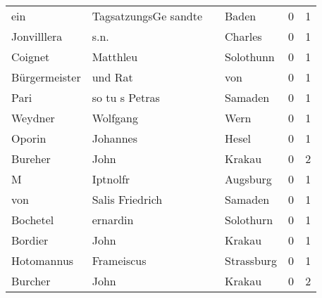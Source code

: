 \begin{tabular}{llllrr}
                      ein &               TagsatzungsGe sandte &             &                                       Baden &          0 &         1 \\
              Jonvilllera &                               s.n. &             &                                     Charles &          0 &         1 \\
                  Coignet &                           Matthleu &             &                                   Solothunn &          0 &         1 \\
            Bürgermeister &                            und Rat &             &                                         von &          0 &         1 \\
                     Pari &                     so tu s Petras &             &                                     Samaden &          0 &         1 \\
                  Weydner &                           Wolfgang &             &                                        Wern &          0 &         1 \\
                   Oporin &                           Johannes &             &                                       Hesel &          0 &         1 \\
                  Bureher &                               John &             &                                      Krakau &          0 &         2 \\
                        M &                           Iptnolfr &             &                                    Augsburg &          0 &         1 \\
                      von &                    Salis Friedrich &             &                                     Samaden &          0 &         1 \\
                 Bochetel &                           ernardin &             &                                   Solothurn &          0 &         1 \\
                  Bordier &                               John &             &                                      Krakau &          0 &         1 \\
               Hotomannus &                         Frameiscus &             &                                  Strassburg &          0 &         1 \\
                  Burcher &                               John &             &                                      Krakau &          0 &         2 \\

\end{tabular}

